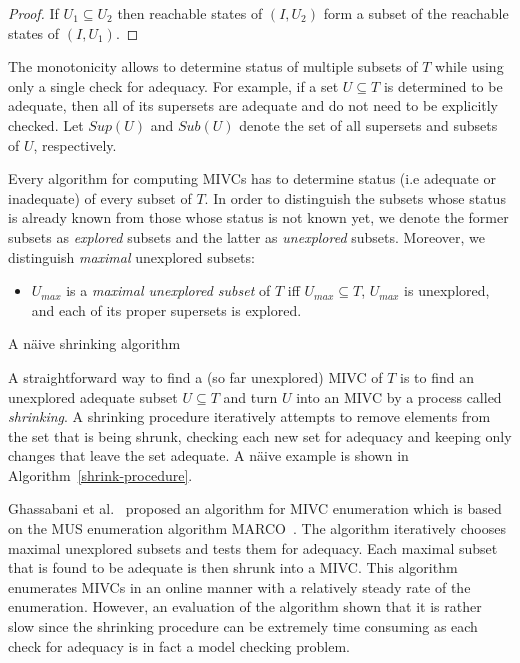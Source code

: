 \vspace{-15pt}
\begin{proof}
If $U_1 \subseteq U_2$ then reachable states of $(I, U_2)$ form  a subset of the reachable states
of $(I, U_1)$.
\end{proof}


\vspace{-5pt}
The monotonicity allows  to determine status  of multiple subsets of $T$ while using only a single check for adequacy. For example, if a set $U \subseteq T$ is determined to be adequate, then all of its supersets are   adequate and do not need to be explicitly checked. Let     $\mathit{Sup}(U)$ and $\mathit{Sub}(U)$ denote the set of all supersets and subsets of $U$, respectively.

Every algorithm for computing MIVCs has to determine status (i.e adequate or inadequate) of every subset of $T$.  In order to distinguish the subsets whose status is already known from those whose status is not known yet, we denote the former subsets as \emph{explored} subsets and the latter as \emph{unexplored} subsets. Moreover, we distinguish \emph{maximal} unexplored subsets:

\vspace{-5pt}
\begin{itemize}
	\item $U_{max}$ is a \emph{maximal unexplored subset} of $T$ iff $U_{max} \subseteq T$, $U_{max}$ is unexplored, and each of its proper supersets is explored.
\end{itemize}
\vspace{-5pt}


\begin{algorithm}[!t]
\begin{small}

\caption{A n\"aive shrinking algorithm }
\label{shrink-procedure}
\end{small}
\end{algorithm}


A straightforward way to find a (so far unexplored) MIVC of $T$ is to find an unexplored adequate subset $U \subseteq T$ and turn $U$  into an MIVC by a process called \emph{shrinking}.  A shrinking procedure iteratively attempts to remove elements from the set that is being shrunk, checking each new set for adequacy and keeping only changes that
leave the set adequate. A n\"aive example is shown in Algorithm~\ref{shrink-procedure}.

Ghassabani et al.~\cite{Ghass17AllIVCs} proposed an  algorithm for MIVC enumeration which is based on the MUS enumeration algorithm MARCO~\cite{Liffiton2016}. The algorithm iteratively chooses maximal unexplored subsets and tests them for adequacy. Each maximal subset that is found to be adequate is then shrunk into a MIVC. This algorithm enumerates MIVCs in an online manner with a relatively steady rate of the enumeration. However, an evaluation of the algorithm shown that it is rather slow since the shrinking procedure can be extremely time consuming as each check for adequacy is in fact a model checking problem.

